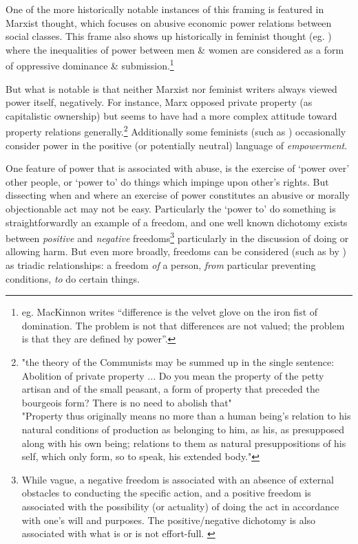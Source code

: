 One of the more historically notable instances of this framing is featured in Marxist thought, which focuses on abusive economic power relations between social classes. This frame also shows up historically in feminist thought (eg. \cite{Cudd2006-CUDAO}) where the inequalities of power between men \& women are considered as a form of oppressive dominance \& submission.\footnote{eg. MacKinnon writes ``difference is the velvet glove on the iron fist of domination. The problem is not that differences are not valued; the problem is that they are defined by power''\cite{mackinnon1989toward}.}

But what is notable is that neither Marxist nor feminist writers always viewed power itself, negatively.
For instance, Marx opposed private property (as capitalistic ownership) but seems to have had a more complex attitude toward property relations generally.\footnote{"the theory of the Communists may be summed up in the single sentence: Abolition of private property ... Do you mean the property of the petty artisan and of the small peasant, a form of property that preceded the bourgeois form? There is no need to abolish that"\cite{MarxGutenberg}\\"Property thus originally means no more than a human being's relation to his natural conditions of production as belonging to him, as his, as presupposed along with his own being; relations to them as natural presuppositions of his self, which only form, so to speak, his extended body."\cite[Notebook V]{marx1993grundrisse}}
Additionally some feminists (such as \cite{doi:10.1111/j.1527-2001.1998.tb01350.x}) occasionally consider power in the positive (or potentially neutral) language of \textit{empowerment}.

One feature of power that is associated with abuse, is the exercise of `power over' other people, or `power to' do things which impinge upon other's rights.
But dissecting when and where an exercise of power constitutes an abusive or morally objectionable act may not be easy.
Particularly the `power to' do something is straightforwardly an example of a freedom, and one well known dichotomy exists between \textit{positive} and \textit{negative} freedoms\footnote{While vague, a negative freedom is associated with an absence of external obstacles to conducting the specific action, and a positive freedom is associated with the possibility (or actuality) of doing the act in accordance with one's will and purposes. The positive/negative dichotomy is also associated with what is or is not effort-full. \citep{Mossel2009-MOSNA}} particularly in the discussion of doing or allowing harm.
But even more broadly, freedoms can be considered (such as by \cite{Negative_and_Positive_Freedom}) as triadic relationships: a freedom \textit{of} a person, \textit{from} particular preventing conditions, \textit{to} do certain things.

